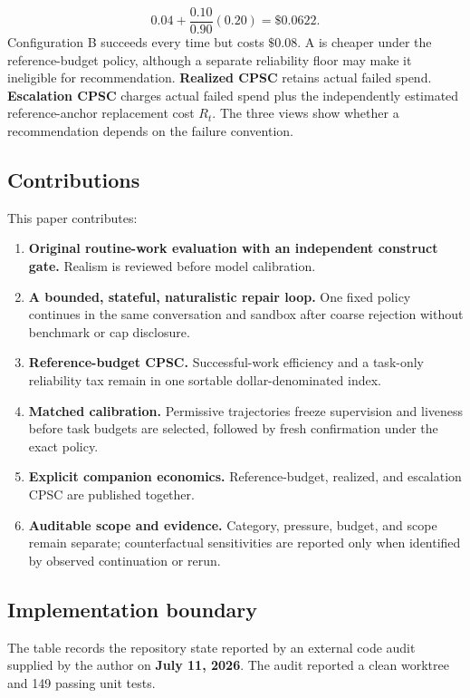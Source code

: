 \documentclass[11pt]{article}
\begin{document}
\[
0.04+\frac{0.10}{0.90}(0.20)=\$0.0622.
\]
Configuration B succeeds every time but costs $\$0.08$. A is cheaper under the reference-budget policy, although a separate reliability floor may make it ineligible for recommendation. \textbf{Realized CPSC} retains actual failed spend. \textbf{Escalation CPSC} charges actual failed spend plus the independently estimated reference-anchor replacement cost $R_t$. The three views show whether a recommendation depends on the failure convention.

\subsection{Contributions}\hypertarget{12-contributions}{}\label{12-contributions}

This paper contributes:

\begin{enumerate}
\item{} \textbf{Original routine-work evaluation with an independent construct gate.} Realism is reviewed before model calibration.
\item{} \textbf{A bounded, stateful, naturalistic repair loop.} One fixed policy continues in the same conversation and sandbox after coarse rejection without benchmark or cap disclosure.
\item{} \textbf{Reference-budget CPSC.} Successful-work efficiency and a task-only reliability tax remain in one sortable dollar-denominated index.
\item{} \textbf{Matched calibration.} Permissive trajectories freeze supervision and liveness before task budgets are selected, followed by fresh confirmation under the exact policy.
\item{} \textbf{Explicit companion economics.} Reference-budget, realized, and escalation CPSC are published together.
\item{} \textbf{Auditable scope and evidence.} Category, pressure, budget, and scope remain separate; counterfactual sensitivities are reported only when identified by observed continuation or rerun.
\end{enumerate}

\subsection{Implementation boundary}\hypertarget{13-implementation-boundary}{}\label{13-implementation-boundary}

The table records the repository state reported by an external code audit supplied by the author on \textbf{July 11, 2026}. The audit reported a clean worktree and 149 passing unit tests.
\end{document}
